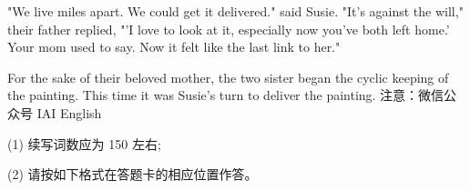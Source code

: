 \documentclass{英语试卷}
\begin{document}
\par "We live miles apart. We could get it delivered." said Susie. "It's against the will," their father replied, "'I love to look at it, especially now you've both left home.' Your mom used to say. Now it felt like the last link to her."\par
\par For the sake of their beloved mother, the two sister began the cyclic keeping of the painting. This time it was Susie's turn to deliver the painting. 注意：微信公众号 IAI English\par
\par (1) 续写词数应为 150 左右;\par
\par (2) 请按如下格式在答题卡的相应位置作答。\par
{}
\end{document}
